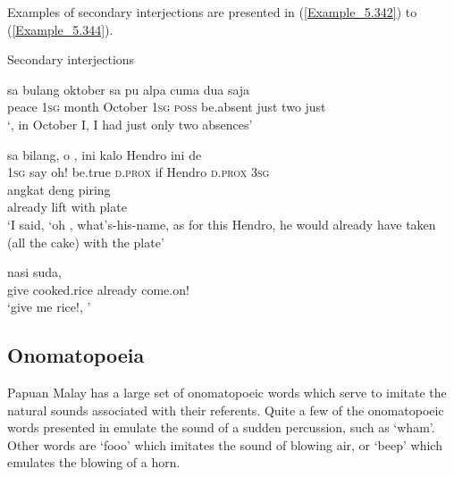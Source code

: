 Examples of secondary interjections are presented in (\ref{Example_5.342}) to (\ref{Example_5.344}).

%
\begin{styleExampleTitle}
Secondary interjections
\end{styleExampleTitle}

\ea
\label{Example_5.342}
 {sa} {bulang} {oktober} {sa} {pu} {alpa} {cuma} {dua} {saja}\\ %
 peace  \textsc{1sg}  month  October  \textsc{1sg}  \textsc{poss}  be.absent  just  two  just\\
\glt 
‘, in October I, I had just only two absences’ \textstyleExampleSource{[081023-004-Cv.0014]}
\z

\ea
\label{Example_5.343}
\gll  sa  {bilang,}  {o}  {},  ini  kalo  Hendro  ini  de\\
 \textsc{1sg}  {say}  {oh!}  {be.true}  \textsc{d.prox}  if  Hendro  \textsc{d.prox}  \textsc{3sg}\\
   {angkat}  {deng}  {piring}\\
 {already}  {lift}  {with}  {plate}\\
\glt 
‘I said, ‘oh , what’s-his-name, as for this Hendro, he would already have taken (all the cake) with the plate’ \textstyleExampleSource{[081011-005-Cv.0028]}
\z

\ea
\label{Example_5.344}
 {nasi} {suda,} {}\\ %
 give  cooked.rice  already  come.on!\\
\glt
‘give me rice!, ’ \textstyleExampleSource{[080922-001a-CvPh.1208]}
\z

\subsection{Onomatopoeia}\label{Para_5.13.4}

Papuan Malay has a large set of onomatopoeic words which serve to imitate the natural sounds associated with their referents. Quite a few of the onomatopoeic words presented in  emulate the sound of a sudden percussion, such as  ‘wham’. Other words are  ‘fooo’ which imitates the sound of blowing air, or  ‘beep’ which emulates the blowing of a horn.


